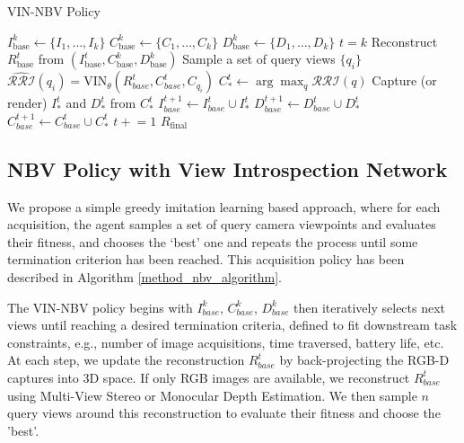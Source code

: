 \setlength{\intextsep}{0pt}
\setlength{\textfloatsep}{1pt}
\begin{algorithm}[!htb]
  \caption{VIN-NBV Policy}
  \label{method_nbv_algorithm}
  \begin{algorithmic}[1]
    \State $I^k_{\mathrm{base}}\gets\{I_1,\dots,I_k\}$
    \State $C^k_{\mathrm{base}}\gets\{C_1,\dots,C_k\}$
    \State $D^k_{\mathrm{base}}\gets\{D_1,\dots,D_k\}$
    \State $t = k$
      \State Reconstruct $R^t_{\mathrm{base}}$ from $(I^t_{\mathrm{base}}, C^k_{\mathrm{base}}, D^k_{\mathrm{base}})$
      \State Sample a set of query views $\{q_i\}$
        \State $\widehat{\mathcal{RRI}}(q_i) = \text{VIN}_\theta(R^{t}_{base}, C^t_{base}, C_{q_i})${\label{line:score_func}}
      \EndFor
        \State $C^t_*\gets\arg\max_q \mathcal{RRI}(q)$
        \State Capture (or render) $I^t_{*}$ and $D^{t}_{*}$ from $C^t_*$
        \State $I^{t+1}_{base} \leftarrow I^t_{base} \cup I^t_{*}$
        \State $D^{t+1}_{base} \leftarrow D^t_{base} \cup D^t_{*}$
        \State $C^{t+1}_{base} \leftarrow C^t_{base} \cup C^t_{*}$
        \State $t \mathrel{+}= 1$
    \EndWhile
    \State \Return $R_{\mathrm{final}}$
  \end{algorithmic}
\end{algorithm}

\vspace{0.5em}
\subsection{NBV Policy with View Introspection Network}
\label{ssec:policy}
\vspace{-0.25em}
We propose a simple greedy imitation learning based approach, where for each acquisition, the agent samples a set of query camera viewpoints and evaluates their fitness, and chooses the `best' one and repeats the process until some termination criterion has been reached. This acquisition policy has been described in Algorithm \ref{method_nbv_algorithm}.

The VIN-NBV policy begins with $I^k_{base}$, $C^k_{base}$, $D^k_{base}$ then iteratively selects next views until reaching a desired termination criteria, defined to fit downstream task constraints, e.g., number of image acquisitions, time traversed, battery life, etc. At each step, we update the reconstruction $R^t_{base}$ by back-projecting the RGB-D captures into 3D space. If only RGB images are available, we reconstruct $R^t_{base}$ using Multi-View Stereo or Monocular Depth Estimation. We then sample $n$ query views around this reconstruction to evaluate their fitness and choose the 'best'. 

